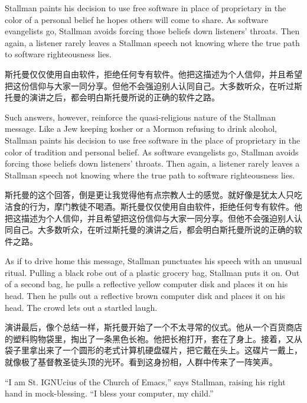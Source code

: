 \ifdefined\eng
Stallman paints his decision to use free software in place of proprietary in the color of a personal belief he hopes others will come to share. As software evangelists go, Stallman avoids forcing those beliefs down listeners' throats. Then again, a listener rarely leaves a Stallman speech not knowing where the true path to software righteousness lies.
\fi

\ifdefined\chs
斯托曼仅仅使用自由软件，拒绝任何专有软件。他把这描述为个人信仰，并且希望把这份信仰与大家一同分享。但他不会强迫别人认同自己。大多数听众，在听过斯托曼的演讲之后，都会明白斯托曼所说的正确的软件之路。
\fi

\fi

\ifdefined\vone

\ifdefined\eng
Such answers, however, reinforce the quasi-religious nature of the Stallman message. Like a Jew keeping kosher or a Mormon refusing to drink alcohol, Stallman paints his decision to use free software in the place of proprietary in the color of tradition and personal belief. As software evangelists go, Stallman avoids forcing those beliefs down listeners' throats. Then again, a listener rarely leaves a Stallman speech not knowing where the true path to software righteousness lies. 
\fi

\ifdefined\chs
斯托曼的这个回答，倒是更让我觉得他有点宗教人士的感觉。就好像是犹太人只吃洁食的行为，摩门教徒不喝酒。斯托曼仅仅使用自由软件，拒绝任何专有软件。他把这描述为个人信仰，并且希望把这份信仰与大家一同分享。但他不会强迫别人认同自己。大多数听众，在听过斯托曼的演讲之后，都会明白斯托曼所说的正确的软件之路。
\fi

\fi

\ifdefined\eng
As if to drive home this message, Stallman punctuates his speech with an unusual ritual. Pulling a black robe out of a plastic grocery bag, Stallman puts it on.  
\ifdefined\vone
Out of a second bag, he pulls a reflective yellow computer disk and places it on his head. 
\fi
\ifdefined\vtwo
Then he pulls out a reflective brown computer disk and places it on his head. 
\fi
The crowd lets out a startled laugh.
\fi

\ifdefined\chs
演讲最后，像个总结一样，斯托曼开始了一个不太寻常的仪式。他从一个百货商店的塑料购物袋里，掏出了一条黑色长袍。他把长袍打开，套在了身上。接着，又从袋子里拿出来了一个圆形的老式计算机硬盘碟片，把它戴在头上。这碟片一戴上，就像极了基督教圣徒头顶的光环。看到这身扮相，人群中传来了一阵笑声。
\fi

\ifdefined\eng
``I am St. IGNUcius of the Church of Emacs,'' says Stallman, raising his right hand in mock-blessing. ``I bless your computer, my child.''
\fi

